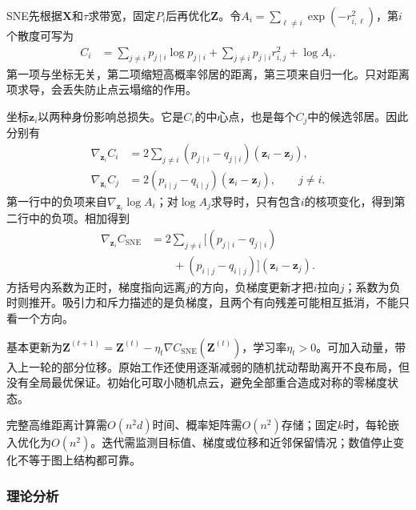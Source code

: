 SNE先根据$\bm{X}$和$\tau$求带宽，固定$P_i$后再优化$\bm{Z}$。令$A_i=\sum_{\ell\ne i}\exp(-r_{i,\ell}^2)$，第$i$个散度可写为
\begin{equation}
  \label{eq:dim-sne-anchor-loss}
  \begin{aligned}
    C_i&=\sum_{j\ne i}p_{j\mid i}\log p_{j\mid i}
      +\sum_{j\ne i}p_{j\mid i}r_{i,j}^2+\log A_i.
  \end{aligned}
\end{equation}
第一项与坐标无关，第二项缩短高概率邻居的距离，第三项来自归一化。只对距离项求导，会丢失防止点云塌缩的作用。

坐标$\bm{z}_i$以两种身份影响总损失。它是$C_i$的中心点，也是每个$C_j$中的候选邻居。因此分别有
\begin{equation}
  \label{eq:dim-sne-two-roles}
  \begin{aligned}
    \nabla_{\bm{z}_i}C_i
      &=2\sum_{j\ne i}(p_{j\mid i}-q_{j\mid i})
        (\bm{z}_i-\bm{z}_j),\\
    \nabla_{\bm{z}_i}C_j
      &=2(p_{i\mid j}-q_{i\mid j})
        (\bm{z}_i-\bm{z}_j),\qquad j\ne i.
  \end{aligned}
\end{equation}
第一行中的负项来自$\nabla_{\bm{z}_i}\log A_i$；对$\log A_j$求导时，只有包含$i$的核项变化，得到第二行中的负项。相加得到
\begin{equation}
  \label{eq:dim-sne-gradient}
  \begin{aligned}
    \nabla_{\bm{z}_i}C_{\mathrm{SNE}}
      &=2\sum_{j\ne i}
        \bigl[(p_{j\mid i}-q_{j\mid i})\\
      &\qquad +(p_{i\mid j}-q_{i\mid j})\bigr]
        (\bm{z}_i-\bm{z}_j).
  \end{aligned}
\end{equation}
方括号内系数为正时，梯度指向远离$j$的方向，负梯度更新才把$i$拉向$j$；系数为负时则推开。吸引力和斥力描述的是负梯度，且两个有向残差可能相互抵消，不能只看一个方向。

基本更新为$\bm{Z}^{(t+1)}=\bm{Z}^{(t)}-\eta_t\nabla C_{\mathrm{SNE}}(\bm{Z}^{(t)})$，学习率$\eta_t>0$。可加入动量，带入上一轮的部分位移。原始工作还使用逐渐减弱的随机扰动帮助离开不良布局，但没有全局最优保证。初始化可取小随机点云，避免全部重合造成对称的零梯度状态。

完整高维距离计算需$O(n^2d)$时间、概率矩阵需$O(n^2)$存储；固定$k$时，每轮嵌入优化为$O(n^2)$。迭代需监测目标值、梯度或位移和近邻保留情况；数值停止变化不等于图上结构都可靠。

\subsubsection{理论分析}
\label{sec:dim-sne-theory}

